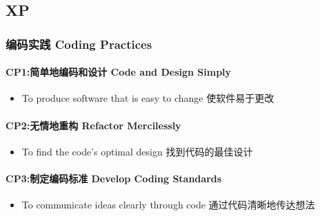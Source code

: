 \documentclass{book}        %
\providecommand{\tightlist}{%
  \setlength{\itemsep}{0pt}\setlength{\parskip}{0pt}}
\let\oldparagraph\paragraph
\renewcommand{\paragraph}[1]{\oldparagraph{#1}\mbox{}}
\begin{document}
\hypertarget{xp}{%
\subsection{XP}\label{xp}}

\hypertarget{ux7f16ux7801ux5b9eux8df5-coding-practices}{%
\subsubsection{编码实践 Coding
Practices}\label{ux7f16ux7801ux5b9eux8df5-coding-practices}}

\hypertarget{cp1ux7b80ux5355ux5730ux7f16ux7801ux548cux8bbeux8ba1-code-and-design-simply}{%
\paragraph{CP1:简单地编码和设计 Code and Design
Simply}\label{cp1ux7b80ux5355ux5730ux7f16ux7801ux548cux8bbeux8ba1-code-and-design-simply}}

\begin{itemize}
\tightlist
\item
  To produce software that is easy to change 使软件易于更改
\end{itemize}

\hypertarget{cp2ux65e0ux60c5ux5730ux91cdux6784-refactor-mercilessly}{%
\paragraph{CP2:无情地重构 Refactor
Mercilessly}\label{cp2ux65e0ux60c5ux5730ux91cdux6784-refactor-mercilessly}}

\begin{itemize}
\tightlist
\item
  To find the code's optimal design 找到代码的最佳设计
\end{itemize}

\hypertarget{cp3ux5236ux5b9aux7f16ux7801ux6807ux51c6-develop-coding-standards}{%
\paragraph{CP3:制定编码标准 Develop Coding
Standards}\label{cp3ux5236ux5b9aux7f16ux7801ux6807ux51c6-develop-coding-standards}}

\begin{itemize}
\tightlist
\item
  To communicate ideas clearly through code 通过代码清晰地传达想法
\end{itemize}
\end{document}
